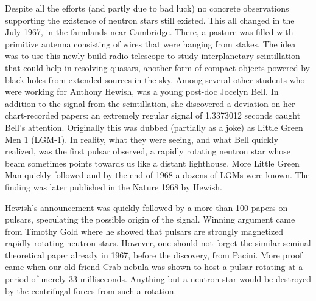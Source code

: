 %

Despite all the efforts (and partly due to bad luck) no concrete observations supporting the existence of neutron stars still existed.
This all changed in the July 1967, in the farmlands near Cambridge.
There, a pasture was filled with primitive antenna consisting of wires that were hanging from stakes.
The idea was to use this newly build radio telescope to study interplanetary scintillation that could help in resolving quasars, another form of compact objects powered by black holes from extended sources in the sky.
Among several other students who were working for Anthony Hewish, was a young post-doc Jocelyn Bell.
In addition to the signal from the scintillation, she discovered a deviation on her chart-recorded papers: 
an extremely regular signal of 1.3373012 seconds caught Bell's attention.
Originally this was dubbed (partially as a joke) as Little Green Men 1 (LGM-1).
In reality, what they were seeing, and what Bell quickly realized, was the first pulsar observed, a rapidly rotating neutron star whose beam sometimes points towards us like a distant lighthouse.
More Little Green Man quickly followed and by the end of 1968 a dozens of LGMs were known.
The finding was later published in the Nature 1968 by Hewish.\cite{Hewish68}

Hewish's announcement was quickly followed by a more than 100 papers on pulsars, speculating the possible origin of the signal.
Winning argument came from Timothy Gold where he showed that pulsars are strongly magnetized rapidly rotating neutron stars.\cite{Gold68}
However, one should not forget the similar seminal theoretical paper already in 1967, before the discovery, from Pacini.\cite{Pacini67}
More proof came when our old friend Crab nebula was shown to host a pulsar rotating at a period of merely $33$ milliseconds.\cite{CCL69}
Anything but a neutron star would be destroyed by the centrifugal forces from such a rotation.

